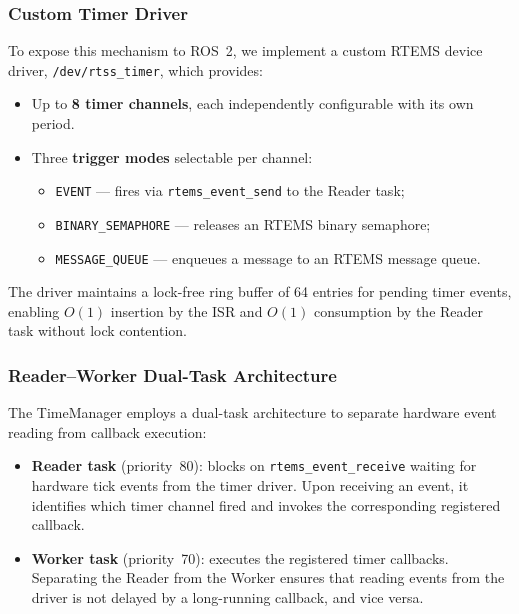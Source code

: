\subsubsection{Custom Timer Driver}

To expose this mechanism to ROS~2, we implement a custom RTEMS device driver, \texttt{/dev/rtss\_timer}, which provides:

\begin{itemize}
    \item Up to \textbf{8 timer channels}, each independently configurable with its own period.
    \item Three \textbf{trigger modes} selectable per channel:
    \begin{itemize}
        \item \texttt{EVENT} --- fires via \texttt{rtems\_event\_send} to the Reader task;
        \item \texttt{BINARY\_SEMAPHORE} --- releases an RTEMS binary semaphore;
        \item \texttt{MESSAGE\_QUEUE} --- enqueues a message to an RTEMS message queue.
    \end{itemize}
\end{itemize}

The driver maintains a lock-free ring buffer of 64 entries for pending timer events, enabling $O(1)$ insertion by the ISR and $O(1)$ consumption by the Reader task without lock contention.

\subsubsection{Reader--Worker Dual-Task Architecture}

The TimeManager employs a dual-task architecture to separate hardware event reading from callback execution:

\begin{itemize}
    \item \textbf{Reader task} (priority~80): blocks on \texttt{rtems\_event\_receive} waiting for hardware tick events from the timer driver.  Upon receiving an event, it identifies which timer channel fired and invokes the corresponding registered callback.
    \item \textbf{Worker task} (priority~70): executes the registered timer callbacks.  Separating the Reader from the Worker ensures that reading events from the driver is not delayed by a long-running callback, and vice versa.
\end{itemize}

